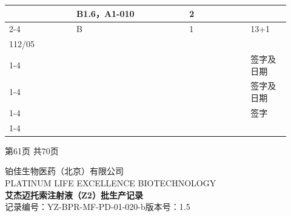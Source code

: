 \documentclass[UTF8,10pt,a4paper,fontset=fandol]{ctexart}
\newcommand{\fieldvalue}[1]{#1}
\newcommand{\handwritten}[1]{#1}
\begin{document}
\begin{tabular}{|p{0.22\linewidth}|p{0.37\linewidth}|p{0.20\linewidth}|p{0.13\linewidth}|}
&
\fieldvalue{\handwritten{B1.6，A1-010}} &
\fieldvalue{\handwritten{2}} & \\ \cline{2-4}

&
\fieldvalue{\handwritten{B}} &
\fieldvalue{\handwritten{1}} &
\fieldvalue{\handwritten{13+1}}
\\ \hline

\fieldvalue{\handwritten{112/05}} & & & \\ \cline{1-4}

& & &
\fieldvalue{\handwritten{签字及日期}} \\ \cline{1-4}

& & &
\fieldvalue{\handwritten{签字及日期}} \\ \cline{1-4}

& & &
\fieldvalue{\handwritten{签字}} \\ \cline{1-4}

\end{tabular}

\vfill

\begin{center}
第61页 共70页
\end{center}


\newpage

\begin{center}
{\small 铂佳生物医药（北京）有限公司}\\
{\scriptsize PLATINUM LIFE EXCELLENCE BIOTECHNOLOGY}\\[2pt]
\textbf{\large 艾杰迈托索注射液（Z2）批生产记录}\\[4pt]
\raggedleft
记录编号：YZ-BPR-MF-PD-01-020-b\qquad 版本号：1.5
\end{center}
\end{document}
